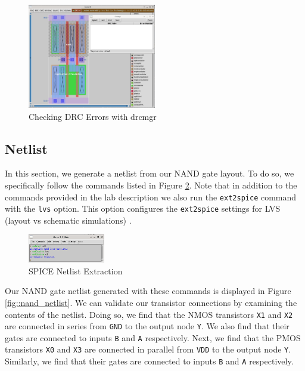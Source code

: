 \documentclass{article}
\begin{document}
	\begin{figure}[H]
		\centerline{\includegraphics[width=0.5\textwidth]{nand_drc_errors_drcmgr.png}}
		\caption{Checking DRC Errors with drcmgr}
		\label{fig::nand_drc_errors_drcmgr}
	\end{figure}
	
	\subsection{Netlist}
	
	In this section, we generate a netlist from our NAND gate layout. To do so, we specifically follow the commands listed in Figure \ref{fig::nand_netlist_creation}. Note that in addition to the commands provided in the lab description we also run the \texttt{ext2spice} command with the \texttt{lvs} option. This option configures the \texttt{ext2spice} settings for LVS (layout vs schematic simulations) \cite{a2021_magic83}.
	
	\begin{figure}[H]
		\centerline{\includegraphics[width=0.3\textwidth]{nand_netlist_creation.png}}
		\caption{SPICE Netlist Extraction}
		\label{fig::nand_netlist_creation}
	\end{figure}
	
	Our NAND gate netlist generated with these commands is displayed in Figure \ref{fig::nand_netlist}. We can validate our transistor connections by examining the contents of the netlist. Doing so, we find that the NMOS transistors \texttt{X1} and \texttt{X2} are connected in series from \texttt{GND} to the output node \texttt{Y}. We also find that their gates are connected to inputs \texttt{B} and \texttt{A} respectively. Next, we find that the PMOS transistors \texttt{X0} and \texttt{X3} are connected in parallel from \texttt{VDD} to the output node \texttt{Y}. Similarly, we find that their gates are connected to inputs \texttt{B} and \texttt{A} respectively.
	
\end{document}
